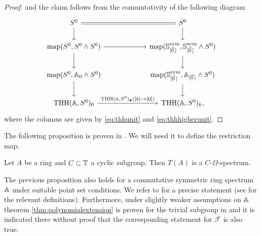 \begin{proof}
and the claim follows from the commutativity of the following diagram
\begin{equation}\label{eq:unitdiagram}
\begin{tikzcd}[column sep = 6em]
S^0
\arrow{d}\arrow[equal]{r}
&S^0
\arrow{d}\\
\map(S^0,S^0\wedge S^0)
\arrow{r}\arrow{d}
& \map(\spherespectrum^{\mathrm{sym}}_{[\vec{0}\,]}, \spherespectrum^{\mathrm{sym}}_{[\vec{0}\,]} \wedge S^0)
\arrow{d}\\
\map(S^0, \A_0\wedge S^0)
\arrow{d}
& \map(\spherespectrum^{\mathrm{sym}}_{[\vec{0}\,]}, \A_{[\vec{0}\,]} \wedge S^0)
\arrow{d}\\
\mathrm{THH}(\A, S^0)_0\arrow{r}{\mathrm{THH}(\A, S^0)_\bullet([k]\to [0])}
&\mathrm{THH}(\A, S^0)_k,
\end{tikzcd}
\end{equation}
where the columns are given by \eqref{eq:thhunit} and \eqref{eq:thhhigherunit}.
\end{proof}


%

The following proposition is proven in \cite[Proposition~2.4, \pno~40]{hmperfect}. We will need it to define the restriction map.
\begin{prop}\label{prop:thhfibrant}
Let $A$ be a ring and $C\subset \mathbb{T}$ a cyclic subgroup. Then $T(A)$ is a $C$-$\Omega$-spectrum.
\end{prop}

\begin{rem}\label{rem:connectiveplus}
The previous proposition also holds for a commutative symmetric ring spectrum
$\mathbb{A}$ under suitable point set conditions. We refer to \cite[Proposition~8.3, \pno~975]{lrrvthh}
for a precise statement (see \cite[Definitions~4.7, 4.8 and 4.9, \pno~952]{lrrvthh} for the relevant definitions).
Furthermore, under slightly weaker assumptions on $\mathbb{A}$ theorem \ref{thm:polynomialextension}
is proven for the trivial subgroup in \cite[Theorem~6.10, \pno~963]{lrrvthh} and it is indicated
there without proof that the corresponding statement for $\mathcal{F}$ is also true.
\end{rem}




